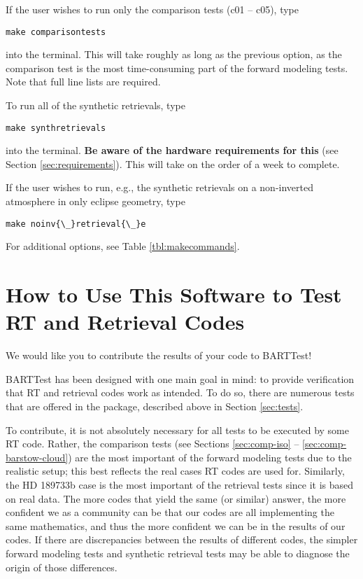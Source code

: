 \documentclass[letterpaper, 12pt]{article}
\begin{document}
If the user wishes to run only the comparison tests (c01 -- c05), type
\begin{verbatim}
make comparisontests
\end{verbatim}
into the terminal. This will take roughly as long as the previous option, as 
the comparison test is the most time-consuming part of the forward modeling 
tests. Note that full line lists are required.

To run all of the synthetic retrievals, type
\begin{verbatim}
make synthretrievals
\end{verbatim}
into the terminal. \textbf{Be aware of the hardware requirements for this} 
(see Section \ref{sec:requirements}). This will take on the order of a week to complete.

If the user wishes to run, e.g., the synthetic retrievals on a non-inverted 
atmosphere in only eclipse geometry, type
\begin{verbatim}
make noinv{\_}retrieval{\_}e
\end{verbatim}

For additional options, see Table \ref{tbl:makecommands}.

\section{How to Use This Software to Test RT and Retrieval Codes}
\label{sec:howto}
We would like you to contribute the results of your code to BARTTest! 

BARTTest has been designed with one main goal in mind: to provide verification 
that RT and retrieval codes work as intended. To do so, there are numerous 
tests that are offered in the package, described above in Section \ref{sec:tests}.

To contribute, it is not absolutely necessary for all tests to be executed by 
some RT code. Rather, the comparison tests (see Sections \ref{sec:comp-iso} -- 
\ref{sec:comp-barstow-cloud}) are the most important of the forward modeling 
tests due to the realistic setup; this best reflects the real cases RT codes 
are used for. Similarly, the HD 189733b case is the most important of the 
retrieval tests since it is based on real data. The more codes that yield the 
same (or similar) answer, the more confident we as a community can be that our 
codes are all implementing the same mathematics, and thus the more confident 
we can be in the results of our codes. If there are discrepancies between the 
results of different codes, the simpler forward modeling tests and synthetic 
retrieval tests may be able to diagnose the origin of those differences.
\end{document}

